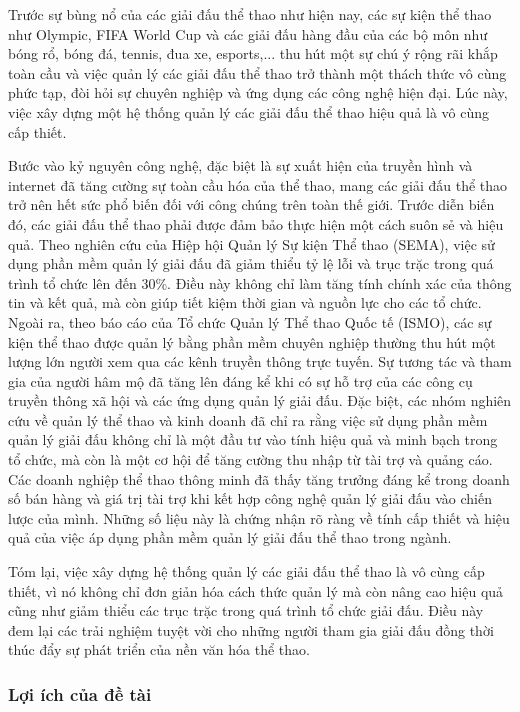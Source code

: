 Trước sự bùng nổ của các giải đấu thể thao như hiện nay, các sự kiện thể thao như
Olympic, FIFA World Cup và các giải đấu hàng đầu của các bộ môn như bóng rổ, bóng đá,
tennis, đua xe, esports,... thu hút một sự chú ý rộng rãi khắp toàn cầu và việc quản lý các giải đấu thể thao trở thành một thách thức vô cùng phức tạp, đòi hỏi sự chuyên nghiệp và ứng dụng các công nghệ hiện đại. Lúc này, việc xây dựng một hệ thống quản lý các giải đấu thể thao hiệu quả là vô cùng cấp thiết.
\par
Bước vào kỷ nguyên công nghệ, đặc biệt là sự xuất hiện của truyền hình và internet
đã tăng cường sự toàn cầu hóa của thể thao, mang các giải đấu thể thao trở nên hết
sức phổ biến đối với công chúng trên toàn thế giới. Trước diễn biến đó, các giải đấu
thể thao phải được đảm bảo thực hiện một cách suôn sẻ và hiệu quả. Theo nghiên cứu của
Hiệp hội Quản lý Sự kiện Thể thao (SEMA), việc sử dụng phần mềm quản lý giải đấu đã giảm
thiểu tỷ lệ lỗi và trục trặc trong quá trình tổ chức lên đến 30\%. Điều này không chỉ làm tăng tính chính xác của thông tin và kết quả, mà còn giúp tiết kiệm thời gian và nguồn lực cho các tổ chức. Ngoài ra, theo báo cáo của Tổ chức Quản lý Thể thao Quốc tế (ISMO), các sự kiện thể thao được quản lý bằng phần mềm chuyên nghiệp thường thu hút một lượng lớn người xem qua các kênh truyền thông trực tuyến. Sự tương tác và tham gia của người hâm mộ đã tăng lên đáng kể khi có sự hỗ trợ của các công cụ truyền thông xã hội và các ứng dụng quản lý giải đấu. Đặc biệt, các nhóm nghiên cứu về quản lý thể thao và kinh doanh đã chỉ ra rằng việc sử dụng phần mềm quản lý giải đấu không chỉ là một đầu tư vào tính hiệu quả và minh bạch trong tổ chức, mà còn là một cơ hội để tăng cường thu nhập từ tài trợ và quảng cáo. Các doanh nghiệp thể thao thông minh đã thấy tăng trưởng đáng kể trong doanh số bán hàng và giá trị tài trợ khi kết hợp công nghệ quản lý giải đấu vào chiến lược của mình. Những số liệu này là chứng nhận rõ ràng về tính cấp thiết và hiệu quả của việc áp dụng phần mềm quản lý giải đấu thể thao trong ngành.
\par
Tóm lại, việc xây dựng hệ thống quản lý các giải đấu thể thao là vô cùng cấp thiết, vì nó không chỉ đơn giản hóa cách thức quản lý mà còn nâng cao hiệu quả cũng như giảm thiểu các trục trặc trong quá trình tổ chức giải đấu. Điều này đem lại các trải nghiệm tuyệt vời cho những người tham gia giải đấu đồng thời thúc đẩy sự phát triển của nền văn hóa thể thao.


\subsubsection{Lợi ích của đề tài }

